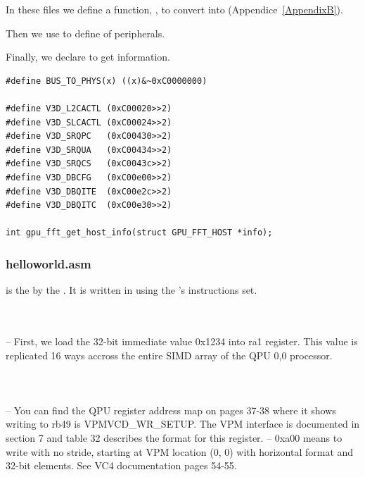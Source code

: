 In these files we define a  function, , to convert  into  (Appendice~\ref{AppendixB}).

Then we use  to define  of \vc{} peripherals.

Finally, we declare  to get \rasp{} information.


\begin{lstlisting}
#define BUS_TO_PHYS(x) ((x)&~0xC0000000)

#define V3D_L2CACTL (0xC00020>>2)
#define V3D_SLCACTL (0xC00024>>2)
#define V3D_SRQPC   (0xC00430>>2)
#define V3D_SRQUA   (0xC00434>>2)
#define V3D_SRQCS   (0xC0043c>>2)
#define V3D_DBCFG   (0xC00e00>>2)
#define V3D_DBQITE  (0xC00e2c>>2)
#define V3D_DBQITC  (0xC00e30>>2)

int gpu_fft_get_host_info(struct GPU_FFT_HOST *info);
\end{lstlisting}


\subsubsection{helloworld.asm}

 is the  by the \vc. It is written in  using the \vc{}'s instructions set.

\\
\\
-- First, we load the 32-bit immediate value 0x1234 into ra1 register. This value is replicated 16 ways accross the entire SIMD array of the QPU 0,0 processor.\\~\\

\\
\\
-- You can find the QPU register address map on pages 37-38 where it shows writing to rb49 is VPMVCD\_WR\_SETUP. The VPM interface is documented in section 7 and table 32 describes the format for this register.
-- 0xa00 means to write with no stride, starting at VPM location (0, 0) with horizontal format and 32-bit elements. See VC4 documentation pages 54-55.\\~\\

